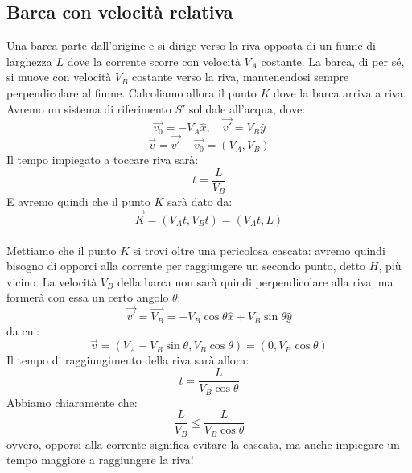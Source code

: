 \documentclass[a4paper,12pt]{article}
\begin{document}
\subsection{Barca con velocità relativa}
Una barca parte dall'origine e si dirige verso la riva opposta di un fiume di larghezza $L$ 
dove la corrente scorre con velocità $V_A$ costante. La barca, di per sé, si muove con velocità $V_B$ costante
verso la riva, mantenendosi sempre perpendicolare al fiume. Calcoliamo allora il punto $K$ dove la barca arriva a riva.
Avremo un sistema di riferimento $S'$ solidale all'acqua, dove:
$$ \vec{v_0} = -V_A\hat{x}, \quad \vec{v'} = V_B\hat{y} $$
$$ \vec{v} = \vec{v'} + \vec{v_0} = (V_A, V_B) $$
Il tempo impiegato a toccare riva sarà:
$$ t = \frac{L}{V_B} $$
E avremo quindi che il punto $K$ sarà dato da:
$$ \vec{K} = (V_At, V_Bt) = (V_At, L) $$
\\
Mettiamo che il punto $K$ si trovi oltre una pericolosa cascata: avremo quindi bisogno di opporci alla corrente
per raggiungere un secondo punto, detto $H$, più vicino. La velocità $V_B$ della barca non sarà quindi perpendicolare
alla riva, ma formerà con essa un certo angolo $\theta$:
$$ \vec{v'} = \vec{V_B} = -V_B\cos{\theta}\hat{x} + V_B\sin{\theta}\hat{y} $$
da cui:
$$ \vec{v} = (V_A - V_B\sin{\theta}, V_B\cos{\theta}) = (0, V_B\cos{\theta}) $$
Il tempo di raggiungimento della riva sarà allora:
$$ t = \frac{L}{V_B\cos{\theta}} $$
Abbiamo chiaramente che:
$$ \frac{L}{V_B} \leq \frac{L}{V_B\cos{\theta}} $$
ovvero, opporsi alla corrente significa evitare la cascata, ma anche impiegare un tempo maggiore a raggiungere
la riva!
\end{document}
